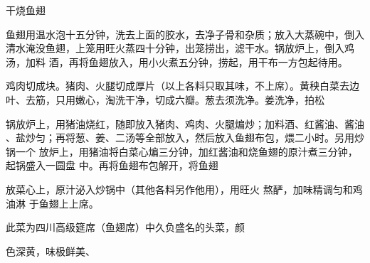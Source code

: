 \begin{recipe}{干烧鱼翅}

\ingredients


\preparation

\step 鱼翅用温水泡十五分钟，洗去上面的胶水，去净子骨和杂质；放入大蒸碗中，倒入
清水淹没鱼翅，上笼用旺火蒸四十分钟，出笼捞出，滤干水。锅放炉上，倒入鸡汤，加料
酒，再将鱼翅放入，用小火煮五分钟，捞起，用干布一方包起待用。

\step 鸡肉切成块。猪肉、火腿切成厚片（以上各料只取其味，不上席）。黄秧白菜去边
叶、去筋，只用嫩心，淘洗干净，切成六瓣。葱去须洗净。姜洗净，拍松

\step 锅放炉上，用猪油烧红，随即放入猪肉、鸡肉、火腿煸炒；加料酒、红酱油、酱油
、盐炒匀；再将葱、姜、二汤等全部放入，然后放入鱼翅布包，煨二小时。另用炒锅一个
放炉上，用猪油将白菜心煸三分钟，加红酱油和烧鱼翅的原汁煮三分钟，起锅盛入一圆盘
中。再将鱼翅布包解开，将鱼翅

放菜心上，原汁泌入炒锅中（其他各料另作他用），用旺火 熬酽，加味精调匀和鸡油淋
于鱼翅上上席。

\features

此菜为四川高级筵席（鱼翅席）中久负盛名的头菜，颜

色深黄，味极鲜美、

\end{recipe}


